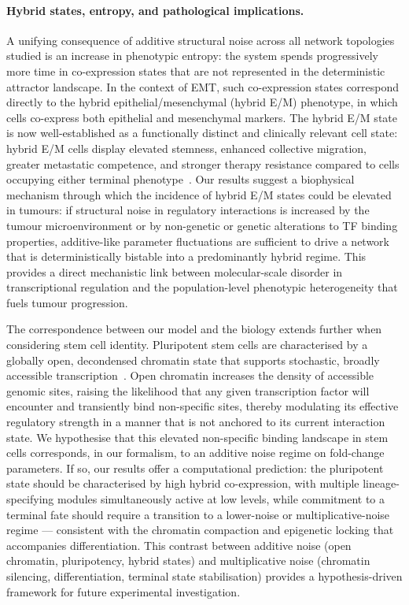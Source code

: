 \documentclass[11pt]{article}
\begin{document}
\paragraph{Hybrid states, entropy, and pathological implications.}
A unifying consequence of additive structural noise across all network topologies studied is an increase in phenotypic entropy: the system spends progressively more time in co-expression states that are not represented in the deterministic attractor landscape. In the context of EMT, such co-expression states correspond directly to the hybrid epithelial/mesenchymal (hybrid E/M) phenotype, in which cells co-express both epithelial and mesenchymal markers. The hybrid E/M state is now well-established as a functionally distinct and clinically relevant cell state: hybrid E/M cells display elevated stemness, enhanced collective migration, greater metastatic competence, and stronger therapy resistance compared to cells occupying either terminal phenotype~\cite{Pastushenko2019EMTMetastasis, jolly2015implications, pasani2020hybrid, Sahoo2021}. Our results suggest a biophysical mechanism through which the incidence of hybrid E/M states could be elevated in tumours: if structural noise in regulatory interactions is increased by the tumour microenvironment or by non-genetic or genetic alterations to TF binding properties, additive-like parameter fluctuations are sufficient to drive a network that is deterministically bistable into a predominantly hybrid regime. This provides a direct mechanistic link between molecular-scale disorder in transcriptional regulation and the population-level phenotypic heterogeneity that fuels tumour progression.

The correspondence between our model and the biology extends further when considering stem cell identity. Pluripotent stem cells are characterised by a globally open, decondensed chromatin state that supports stochastic, broadly accessible transcription~\cite{Meshorer2006HyperdynamicCells, Efroni2008GlobalCells}. Open chromatin increases the density of accessible genomic sites, raising the likelihood that any given transcription factor will encounter and transiently bind non-specific sites, thereby modulating its effective regulatory strength in a manner that is not anchored to its current interaction state. We hypothesise that this elevated non-specific binding landscape in stem cells corresponds, in our formalism, to an additive noise regime on fold-change parameters. If so, our results offer a computational prediction: the pluripotent state should be characterised by high hybrid co-expression, with multiple lineage-specifying modules simultaneously active at low levels, while commitment to a terminal fate should require a transition to a lower-noise or multiplicative-noise regime — consistent with the chromatin compaction and epigenetic locking that accompanies differentiation. This contrast between additive noise (open chromatin, pluripotency, hybrid states) and multiplicative noise (chromatin silencing, differentiation, terminal state stabilisation) provides a hypothesis-driven framework for future experimental investigation.
\end{document}
